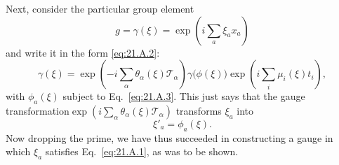 Next, consider the particular group element
\begin{equation}
 g=\gamma(\xi)=\exp\left(i\sum_a\xi_ax_a\right)
 \tag{21.A.9}\label{eq:21.A.9}
\end{equation}
and write it in the form \eqref{eq:21.A.2}:
\begin{equation}
 \gamma(\xi)
 =\exp\left(-i\sum_\alpha\theta_\alpha(\xi)\mathcal T_\alpha\right)
 \gamma\bigl(\phi(\xi)\bigr)
 \exp\left(i\sum_i\mu_i(\xi)t_i\right),
 \tag{21.A.10}\label{eq:21.A.10}
\end{equation}
with $\phi_a(\xi)$ subject to Eq.~\eqref{eq:21.A.3}. This just says that the
gauge transformation\linebreak[4]
$\exp\left(i\sum_\alpha\theta_\alpha(\xi)\mathcal T_\alpha\right)$
transforms $\xi_a$ into
\begin{equation}
 \xi'_a=\phi_a(\xi).
 \tag{21.A.11}\label{eq:21.A.11}
\end{equation}
Now dropping the prime, we have thus succeeded in constructing a gauge in
which $\xi_a$ satisfies Eq.~\eqref{eq:21.A.1}, as was to be shown.
